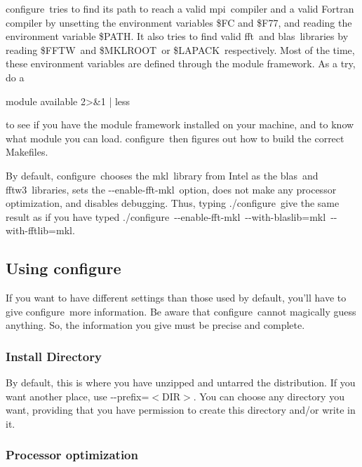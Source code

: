 {\ttfamily configure} tries to find its path to reach a valid mpi compiler and a valid Fortran compiler by unsetting the environment variables {\ttfamily \$\-F\-C} and {\ttfamily \$\-F77}, and reading the environment variable {\ttfamily \$\-P\-A\-T\-H}. It also tries to find valid fft and blas libraries by reading {\ttfamily \$\-F\-F\-T\-W} and {\ttfamily \$\-M\-K\-L\-R\-O\-O\-T} or {\ttfamily \$\-L\-A\-P\-A\-C\-K} respectively. Most of the time, these environment variables are defined through the {\ttfamily module} framework. As a try, do a \begin{DoxyVerb}    module available 2>&1 | less
\end{DoxyVerb}


to see if you have the {\ttfamily module} framework installed on your machine, and to know what {\ttfamily module} you can load. {\ttfamily configure} then figures out how to build the correct Makefiles.

By default, {\ttfamily configure} chooses the mkl library from Intel as the blas and fftw3 libraries, sets the {\ttfamily -\/-\/enable-\/fft-\/mkl} option, does not make any processor optimization, and disables debugging. Thus, typing {\ttfamily ./}{\ttfamily configure} give the same result as if you have typed {\ttfamily ./}{\ttfamily configure} {\ttfamily -\/-\/enable-\/fft-\/mkl} {\ttfamily -\/-\/with-\/blaslib=}{\ttfamily mkl} {\ttfamily -\/-\/with-\/fftlib=}{\ttfamily mkl}.

\subsection*{Using {\ttfamily configure}}

If you want to have different settings than those used by default, you’ll have to give {\ttfamily configure} more information. Be aware that {\ttfamily configure} cannot magically guess anything. So, the information you give must be precise and complete.

\subsubsection*{Install Directory}

By default, this is where you have unzipped and untarred the distribution. If you want another place, use {\ttfamily -\/-\/prefix=$<$D\-I\-R$>$}. You can choose any directory you want, providing that you have permission to create this directory and/or write in it.

\subsubsection*{Processor optimization}

